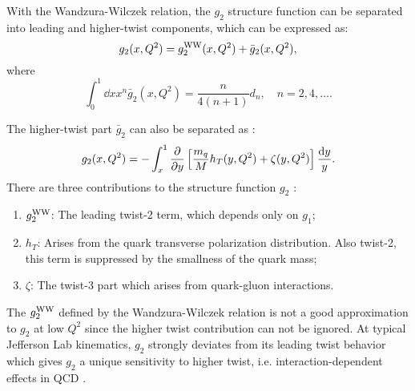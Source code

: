With the Wandzura-Wilczek relation, the $g_2$ structure function can be separated into leading and higher-twist components, which can be expressed as:
\begin{equation} \label{C3S2SS1E16}
g_2(x,Q^2) = g_2^{\mathrm{WW}}(x,Q^2)+\bar{g}_2(x,Q^2),
\end{equation}
where
\begin{equation} \label{C3S2SS1E17}
\int_0^1\dd{x}x^n\bar{g}_2(x,Q^2) = \frac{n}{4(n+1)}d_n, \quad n = 2,4,\dots.
\end{equation}

The higher-twist part $\bar{g}_2$ can also be separated as \cite{Slifer2004}:
\begin{equation} \label{C3S2SS1E18}
g_2(x,Q^2) = -\int_x^1\pdv{y}\left[\frac{m_q}{M}h_T(y,Q^2)+\zeta(y,Q^2)\right]\frac{\dd{y}}{y}.
\end{equation}
There are three contributions to the structure function $g_2$ \cite{G2P}:
\begin{enumerate}
\item $g_2^{\mathrm{WW}}$: The leading twist-2 term, which depends only on $g_1$;
\item $h_T$: Arises from the quark transverse polarization distribution. Also twist-2, this term is suppressed by the smallness of the quark mass;
\item $\zeta$: The twist-3 part which arises from quark-gluon interactions.
\end{enumerate}

The $g_2^{\mathrm{WW}}$ defined by the Wandzura-Wilczek relation is not a good approximation to $g_2$ at low $Q^2$ since the higher twist contribution can not be ignored. At typical Jefferson Lab kinematics, $g_2$ strongly deviates from its leading twist behavior which gives $g_2$ a unique sensitivity to higher twist, i.e. interaction-dependent effects in QCD \cite{Jaffe1990}.

